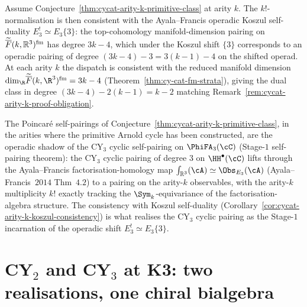 \begin{corollary}
\label{cor:cycat-arity-k-koszul-consistency}
\ClaimStatusConditional
Assume Conjecture~\ref{thm:cycat-arity-k-primitive-class} at arity $k$.
The $k!$-normalisation is then consistent with the Ayala--Francis
operadic Koszul self-duality $E_3^! \simeq E_3\{3\}$: the
top-cohomology manifold-dimension pairing on
$\widetilde{\overline{F}}(k, \mathbb{R}^3)^{\mathrm{fm}}$ has degree
$3k - 4$, which under the Koszul shift $\{3\}$ corresponds to an
operadic pairing of degree $(3k-4) - 3 = 3(k-1) - 4$ on the shifted
operad. At each arity $k$ the dispatch is consistent with the
reduced manifold dimension $\mathrm{dim}_\R\widetilde{\FMbar}(k,\R^3)^{\mathrm{fm}}
= 3k - 4$ (Theorem~\ref{thm:cy-cat-fm-strata}), giving the dual class
in degree $(3k-4) - 2(k-1) = k - 2$ matching
Remark~\ref{rem:cycat-arity-k-proof-obligation}.
\end{corollary}

\begin{remark}
\label{rem:cycat-arity-k-phi-fa-pairing}
The Poincar\'e self-pairings of
Conjecture~\ref{thm:cycat-arity-k-primitive-class}, in the arities where
the primitive Arnold cycle has been constructed, are the operadic
shadow of the CY$_3$ cyclic self-pairing on
$\PhiFA_3(\cC)$ (Stage-$1$ self-pairing theorem):
the CY$_3$ cyclic pairing of degree $3$ on $\HH^\bullet(\cC)$ lifts
through the Ayala--Francis factorisation-homology map
$\int_{\mathbb{R}^3}(\cA) \simeq \Obs_{E_3}(\cA)$
(Ayala--Francis~$2014$ Thm~$4.2$) to a pairing on the arity-$k$
observables, with the arity-$k$ multiplicity $k!$ exactly tracking
the $\Sym_k$-equivariance of the factorisation-algebra structure.
The consistency with Koszul self-duality
(Corollary~\ref{cor:cycat-arity-k-koszul-consistency}) is what
realises the CY$_3$ cyclic pairing as the Stage-$1$ incarnation of
the operadic shift $E_3^! \simeq E_3\{3\}$.
\end{remark}

\section{CY\texorpdfstring{$_2$}{-2} and CY\texorpdfstring{$_3$}{-3} at K3: two realisations, one chiral bialgebra}
\label{sec:cycat-K3-two-realisations}

